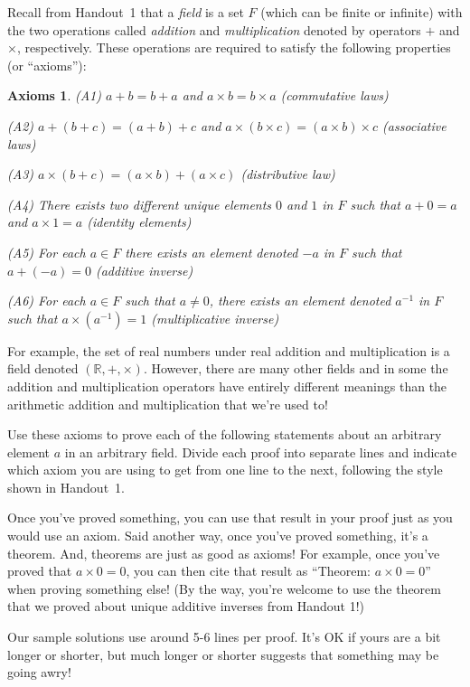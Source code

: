 \documentclass[11pt]{article}
\newtheorem{axioms}{Axioms}
\begin{document}
Recall from Handout~1 that a \emph{field} is a set $F$ (which can be finite or infinite) with the two operations called \emph{addition} and \emph{multiplication} denoted by operators $+$ and $\times$, respectively.  These operations are required to satisfy the following properties (or ``axioms''):
\begin{axioms}
	\item{(A1)} $a + b = b + a$ and $a \times b = b \times a$ (commutative laws)
	\item{(A2)} $a + (b + c) = (a + b) + c$ and $a \times (b \times c) = (a \times b) \times c$ (associative laws)
	\item{(A3)} $a \times (b + c) = (a \times b) + (a \times c)$ (distributive law)
	\item{(A4)} There exists two different unique elements $0$ and $1$ in $F$ such that $a + 0 = a$ and $a \times 1 = a$ (identity elements)
	\item{(A5)} For each $a \in F$ there exists an element denoted $-a$ in $F$ such that $a + (-a) = 0$ (additive inverse)
	\item{(A6)} For each $a \in F$ such that $a \neq 0$, there exists an element denoted $a^{-1}$ in $F$ such that $a \times (a^{-1}) = 1$ (multiplicative inverse)
\end{axioms}
For example, the set of real numbers under real addition and multiplication is a field denoted $(\mathbb{R}, +, \times)$.  However, there are many other fields and in some the addition and multiplication operators have entirely different meanings than the arithmetic addition and multiplication that we're used to!

Use these axioms to prove each of the following statements about an arbitrary element $a$ in an arbitrary field.  Divide each proof into separate lines and indicate which axiom you are using to get from one line to the next, following the style shown in Handout~1.

Once you've proved something, you can use that result in your proof just as you would use an axiom.  
Said another way, once you've proved something, it's a theorem.  And, theorems are just as good as axioms!
For example, once you've proved that $a \times 0 = 0$, you can then cite that result as ``Theorem:  $a \times 0 = 0$'' when proving something else!
(By the way, you're welcome to use the theorem that we proved about unique additive inverses from Handout 1!)

Our sample solutions use around 5-6 lines per proof.  It's OK if yours are a bit longer or shorter, but much longer or shorter suggests that something may be going awry!
\end{document}
